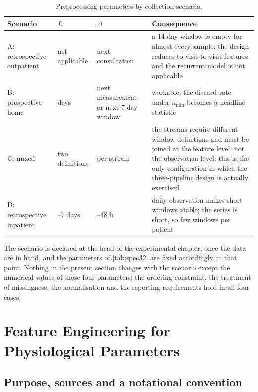 \documentclass[12pt,a4paper,oneside]{report}
\begin{document}
\begin{table}[htbp]
\centering\footnotesize
\caption{Preprocessing parameters by collection scenario.}\label{tab:scenario-params}
\begin{tabularx}{\textwidth}{@{}>{\raggedright\arraybackslash}p{2.6cm} >{\raggedright\arraybackslash}p{2.0cm} >{\raggedright\arraybackslash}p{2.4cm} X@{}}
\toprule
\textbf{Scenario} & \textbf{$L$} & \textbf{$\Delta$} & \textbf{Consequence} \\
\midrule
A: retrospective outpatient & not applicable & next consultation & a 14-day window is empty for almost every sample; the design reduces to visit-to-visit features and the recurrent model is not applicable \\
B: prospective home & 14 days & next measurement or next 7-day window & workable; the discard rate under $n_{\min}$ becomes a headline statistic \\
C: mixed & two definitions & per stream & the streams require different window definitions and must be joined at the feature level, not the observation level; this is the only configuration in which the three-pipeline design is actually exercised \\
D: retrospective inpatient & 3--7 days & 24--48 h & daily observation makes short windows viable; the series is short, so few windows per patient \\
\bottomrule
\end{tabularx}
\end{table}

The scenario is declared at the head of the experimental chapter, once the data are in hand, and the parameters of \cref{tab:spec32} are fixed accordingly at that point. Nothing in the present section changes with the scenario except the numerical values of those four parameters; the ordering constraint, the treatment of missingness, the normalisation and the reporting requirements hold in all four cases.

\section{Feature Engineering for Physiological Parameters}\label{sec:feature-eng}

\subsection*{Purpose, sources and a notational convention}
\end{document}
